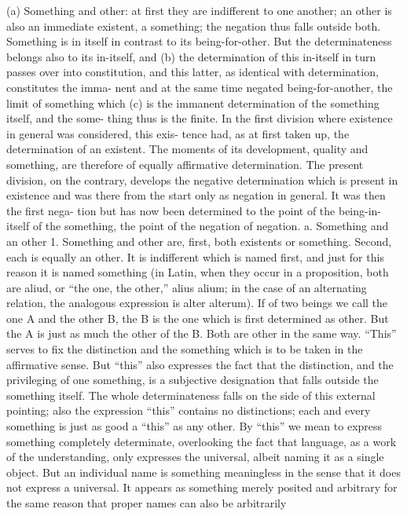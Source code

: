 (a) Something and other: at first they are indifferent to one another; an
other is also an immediate existent, a something; the negation thus falls
outside both. Something is in itself in contrast to its being-for-other.
But the determinateness belongs also to its in-itself, and
(b) the determination of this in-itself in turn passes over into constitution,
and this latter, as identical with determination, constitutes the imma-
nent and at the same time negated being-for-another, the limit of
something which
(c) is the immanent determination of the something itself, and the some-
thing thus is the finite.
In the first division where existence in general was considered, this exis-
tence had, as at first taken up, the determination of an existent. The
moments of its development, quality and something, are therefore of
equally affirmative determination. The present division, on the contrary,
develops the negative determination which is present in existence and was
there from the start only as negation in general. It was then the first nega-
tion but has now been determined to the point of the being-in-itself of the
something, the point of the negation of negation.
a. Something and an other
1. Something and other are, first, both existents or something.
Second, each is equally an other. It is indifferent which is named first,
and just for this reason it is named something (in Latin, when they occur
in a proposition, both are aliud, or “the one, the other,” alius alium; in the
case of an alternating relation, the analogous expression is alter alterum).
If of two beings we call the one A and the other B, the B is the one which
is first determined as other. But the A is just as much the other of the
B. Both are other in the same way. “This” serves to fix the distinction
and the something which is to be taken in the affirmative sense. But
“this” also expresses the fact that the distinction, and the privileging of one
something, is a subjective designation that falls outside the something itself.
The whole determinateness falls on the side of this external pointing; also
the expression “this” contains no distinctions; each and every something is
just as good a “this” as any other. By “this” we mean to express something
completely determinate, overlooking the fact that language, as a work of
the understanding, only expresses the universal, albeit naming it as a single
object. But an individual name is something meaningless in the sense that
it does not express a universal. It appears as something merely posited and
arbitrary for the same reason that proper names can also be arbitrarily
